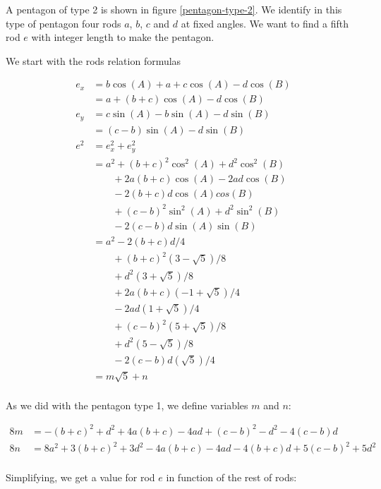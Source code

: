 \documentclass[11pt]{article}
\begin{document}
A pentagon of type 2 is shown in figure \ref{pentagon-type-2}. We identify in this type of pentagon four rods $a$, $b$, $c$ and $d$ at fixed angles. We want to find a fifth rod $e$ with integer length to make the pentagon.

We start with the rods relation formulas

\begin{align*}
e_x &= b\cos(A) + a + c\cos(A) - d\cos(B) \\
      &= a + (b + c)\cos(A) - d\cos(B) \\
e_y &= c\sin(A) - b\sin(A) - d\sin(B) \\
      &= (c - b)\sin(A) - d\sin(B) 
\\
e^2 &= e_x^2 + e_y^2 \\
    &= a^2 + (b + c)^2\cos^2(A) + d^2\cos^2(B) \\
    &\qquad + 2a(b + c)\cos(A) - 2ad\cos(B) \\
    &\qquad - 2(b + c)d\cos(A)cos(B) \\
    &\qquad + (c - b)^2\sin^2(A) + d^2\sin^2(B) \\
    &\qquad - 2(c - b)d\sin(A)\sin(B) \\
    &= a^2 - 2(b + c)d / 4 \\
    &\qquad + (b + c)^2 ( 3 - \sqrt{5}) / 8 \\
    &\qquad + d^2       ( 3 + \sqrt{5}) / 8 \\
    &\qquad + 2a(b + c) (-1 + \sqrt{5}) / 4 \\
    &\qquad - 2ad( 1 + \sqrt{5}) / 4 \\
    &\qquad + (c - b)^2 ( 5 + \sqrt{5}) / 8 \\
    &\qquad + d^2       ( 5 - \sqrt{5}) / 8 \\
    &\qquad - 2(c - b)d ( \sqrt{5}) / 4 \\
    &= m\sqrt{5} + n \\
\end{align*}

As we did with the pentagon type 1, we define variables $m$ and $n$:

\begin{align*}
8m &= -(b+c)^2 + d^2 + 4a(b+c) - 4ad + (c-b)^2 - d^2 - 4(c-b)d \\
8n &= 8a^2 + 3(b+c)^2 + 3d^2 - 4a(b+c) - 4ad - 4(b+c)d + 5(c-b)^2 + 5d^2 \\
\end{align*}

Simplifying, we get a value for rod $e$ in function of the rest of rods:
\end{document}
